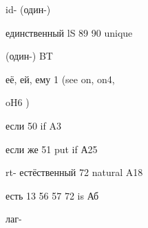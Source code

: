 \begin{minipage}[t]{0.475\textwidth}
\noindent id- (один-)\par
\noindent единственный lS 89 90 unique\par
\noindent (один-) BT\par
\noindent её, ей, ему 1 (see on, on4,\par
\noindent oH6 )\par
\noindent если 50 if A3\par
\noindent если же 51 put if А25\par
\noindent rt- естёственный 72 natural A18\par
\noindent есть 13 56 57 72 is Аб\par
\noindent лаг-\par
\end{minipage}
\endgroup

\clearpage
\thispagestyle{plain}
\begingroup
\cyrillicfont
\fontsize{7.25}{8.25}\selectfont
\setlength{\parindent}{0pt}
\setlength{\parskip}{0pt}
\setlength{\emergencystretch}{1.5em}
\noindent
